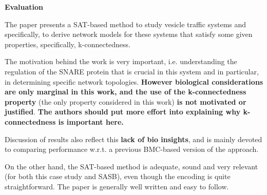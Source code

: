 \documentclass{llncs}
\begin{document}
\textbf{Evaluation }

{\color{green!20!blue}The paper presents a SAT-based method to study vesicle traffic systems and
specifically, to derive network models for these systems that satisfy some given
properties, specifically, k-connectedness.

The motivation behind the work is very important, i.e. understanding the regulation
of the SNARE protein that is crucial in this system and in particular, in
determining specific network topologies.  \textbf{However biological considerations are only
marginal in this work, and the use of the k-connectedness property} (the only
property considered in this work) \textbf{is not motivated or justified}. \textbf{The authors should
put more effort into explaining why k-connectedness is important here. }}

Discussion of results also reflect this  \textbf{lack of bio insights}, and is mainly devoted to comparing performance w.r.t. a previous BMC-based version of the approach.

On the other hand, the SAT-based method is adequate, sound and very relevant (for
both this case study and SASB), even though the encoding is quite straightforward.
The paper is generally well written and easy to follow. \\
\end{document}

